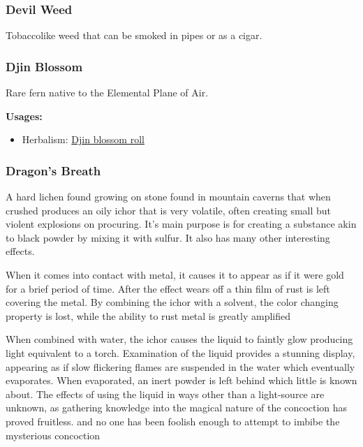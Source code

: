 \subsubsection{Devil Weed}

Tobaccolike weed that can be smoked in pipes or as a cigar.

\subsubsection{Djin Blossom}
\label{Djin Blossom}

Rare fern native to the Elemental Plane of Air.

\vspace{5mm}

\textbf{Usages:}

\begin{itemize}[noitemsep]
\item[] Herbalism: \hyperref[Djin blossom roll]{Djin blossom roll}
\end{itemize}

\subsubsection{Dragon's Breath}
\label{dragons_breath}

A hard lichen found growing on stone found in mountain caverns that when crushed produces an oily ichor that is very volatile, often creating small but violent explosions on procuring. It's main purpose is for creating a substance akin to black powder by mixing it with sulfur. It also has many other interesting effects.

When it comes into contact with metal, it causes it to appear as if it were gold for a brief period of time. After the effect wears off a thin film of rust is left covering the metal. By combining the ichor with a solvent, the color changing property is lost, while the ability to rust metal is greatly amplified

When combined with water, the ichor causes the liquid to faintly glow producing light equivalent to a torch. Examination of the liquid provides a stunning display, appearing as if slow flickering flames are suspended in the water which eventually evaporates. When evaporated, an inert powder is left behind which little is known about. The effects of using the liquid in ways other than a light-source are unknown, as gathering knowledge into the magical nature of the concoction has proved fruitless. and no one has been foolish enough to attempt to imbibe the mysterious concoction

